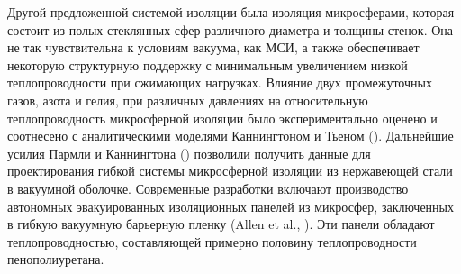 Другой предложенной системой изоляции была изоляция микросферами, которая состоит из полых стеклянных сфер различного диаметра и толщины стенок. Она не так чувствительна к условиям вакуума, как МСИ, а также обеспечивает некоторую структурную поддержку с минимальным увеличением низкой теплопроводности при сжимающих нагрузках. Влияние двух промежуточных газов, азота и гелия, при различных давлениях на относительную теплопроводность микросферной изоляции было экспериментально оценено и соотнесено с аналитическими моделями Каннингтоном и Тьеном (\cite{cunnington1978}). Дальнейшие усилия Пармли и Каннингтона (\cite{parmleycunnington1979}) позволили получить данные для проектирования гибкой системы микросферной изоляции из нержавеющей стали в вакуумной оболочке. Современные разработки включают производство автономных эвакуированных изоляционных панелей из микросфер, заключенных в гибкую вакуумную барьерную пленку (Allen et al., \cite{allen2004}). Эти панели обладают теплопроводностью, составляющей примерно половину теплопроводности пенополиуретана.


